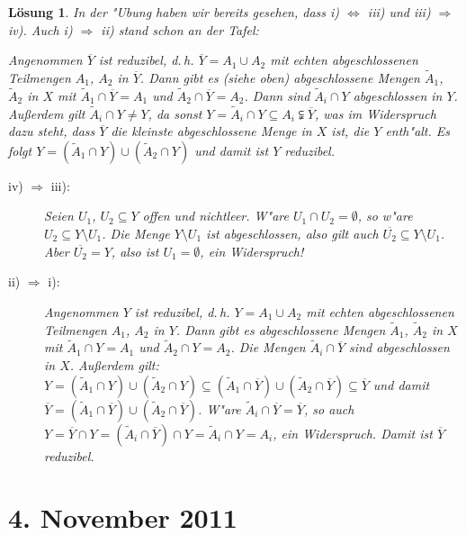 \documentclass[a4paper, 12pt, numbers=noendperiod, chapterprefix=true]{scrbook}
\theoremstyle{break}
\newtheorem{Loes}{L\"osung}
\theoremstyle{nonumberbreak}
\theoremstyle{nonumberplain}
\begin{document}
\begin{Loes}
In der "Ubung haben wir bereits gesehen, dass i) $\Leftrightarrow$ iii) und iii) $\Rightarrow$ iv). 
Auch i) $\Rightarrow$ ii) stand schon an der Tafel:

Angenommen $\overline{Y}$ ist reduzibel, d.\,h. $\overline{Y} = A_1 \cup A_2$ mit echten abgeschlossenen Teilmengen $A_1$, $A_2$ in $\overline{Y}$. Dann gibt es (siehe oben) abgeschlossene Mengen $\tilde{A}_1$, $\tilde{A}_2$ in $X$ mit $\tilde{A}_1 \cap \overline{Y} = A_1$ und $\tilde{A}_2 \cap \overline{Y} = A_2$. Dann sind $\tilde{A}_i \cap Y$ abgeschlossen in $Y$. Au\ss erdem gilt $\tilde{A}_i \cap Y \neq Y$, da sonst $Y = \tilde{A}_i \cap Y \subseteq A_i \subsetneqq \overline{Y}$, was im Widerspruch dazu steht, dass $\overline{Y}$ die kleinste abgeschlossene Menge in $X$ ist, die $Y$ enth"alt. Es folgt $Y = (\tilde{A}_1 \cap Y) \cup (\tilde{A}_2 \cap Y)$ und damit ist $Y$ reduzibel.
\begin{description}
\item[iv) $\Rightarrow$ iii):]
	Seien $U_1$, $U_2 \subseteq Y$ offen und nichtleer. W"are $U_1\cap U_2= \emptyset$, so w"are $U_2 \subseteq Y\setminus U_1$. Die Menge $Y\setminus U_1$ ist abgeschlossen, also gilt auch $\overline{U_2}\subseteq Y\setminus U_1$. Aber $\overline{U_2}= Y$, also ist $U_1 =\emptyset$, ein Widerspruch!
\item[ii) $\Rightarrow$ i):]
	Angenommen $Y$ ist reduzibel, d.\,h. $Y = A_1 \cup A_2$ mit echten abgeschlossenen Teilmengen $A_1$, $A_2$ in $Y$. Dann gibt es abgeschlossene Mengen $\tilde{A}_1$, $\tilde{A}_2$ in $X$ mit $\tilde{A}_1 \cap Y = A_1$ und $\tilde{A}_2 \cap Y = A_2$. Die Mengen $\tilde{A}_i \cap \overline{Y}$ sind abgeschlossen in $X$. Au\ss erdem gilt: $Y = (\tilde{A}_1 \cap Y) \cup (\tilde{A}_2 \cap Y) \subseteq (\tilde{A}_1 \cap \overline{Y}) \cup (\tilde{A}_2 \cap \overline{Y}) \subseteq \overline{Y}$ und damit $\overline{Y} = (\tilde{A}_1 \cap \overline{Y}) \cup (\tilde{A}_2 \cap \overline{Y})$. W"are $\tilde{A}_i \cap \overline{Y} = \overline{Y}$, so auch $Y = \overline{Y} \cap Y = (\tilde{A}_i \cap \overline{Y}) \cap Y = \tilde{A}_i \cap Y = A_i$, ein Widerspruch. Damit ist $\overline{Y}$ reduzibel.
\end{description}\end{Loes}

\newpage
\section{4. November 2011}
\setcounter{Aufg}{0}
\setcounter{Loes}{0}
\end{document}
